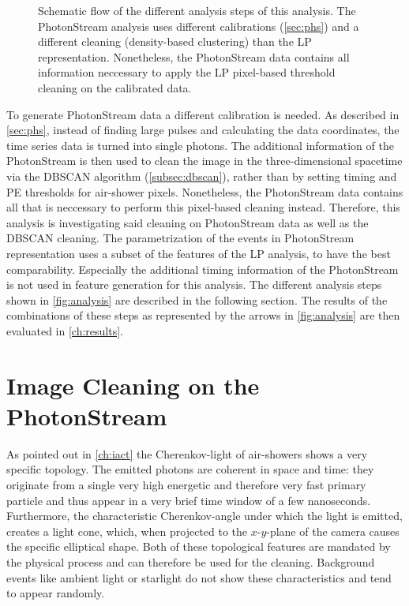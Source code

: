 \begin{figure}[H]
  \caption{Schematic flow of the different analysis steps of this analysis. The PhotonStream analysis uses different calibrations (\autoref{sec:phs}) and a different cleaning (density-based clustering) than the LP representation. Nonetheless, the PhotonStream data contains all information neccessary to apply the LP pixel-based threshold cleaning on the calibrated data.}
  \label{fig:analysis}
\end{figure}
%
To generate PhotonStream data a different calibration is needed. As described
in \autoref{sec:phs}, instead of finding large pulses and calculating the data
coordinates, the time series data is turned into single photons. The additional
information of the PhotonStream is then used to clean the image in the
three-dimensional spacetime via the DBSCAN algorithm (\autoref{subsec:dbscan}), rather than by setting
timing and PE thresholds for air-shower pixels. Nonetheless, the PhotonStream
data contains all that is neccessary to perform this pixel-based cleaning
instead. Therefore, this analysis is investigating said cleaning on
PhotonStream data as well as the DBSCAN cleaning. The parametrization of the
events in PhotonStream representation uses a subset of the features of the LP
analysis, to have the best comparability. Especially the additional timing
information of the PhotonStream is not used in feature generation for this
analysis. The different analysis steps shown in \autoref{fig:analysis} are
described in the following section. The results of the combinations of these
steps as represented by the arrows in \autoref{fig:analysis} are then evaluated
in \autoref{ch:results}.

\section{Image Cleaning on the PhotonStream}\label{sec:phs_clean}
%
As pointed out in \autoref{ch:iact} the Cherenkov-light of air-showers shows a
very specific topology. The emitted photons are coherent in space and time:
they originate from a single very high energetic and therefore very fast
primary particle and thus appear in a very brief time window of a few
nanoseconds. Furthermore, the characteristic Cherenkov-angle under which the
light is emitted, creates a light cone, which, when projected to the
$x$-$y$-plane of the camera causes the specific elliptical shape. Both of these
topological features are mandated by the physical process and can therefore be
used for the cleaning. Background events like ambient light or
starlight do not show these characteristics and tend to appear randomly.

